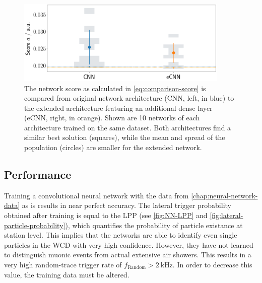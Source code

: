 \begin{figure}
	\centering
	\includegraphics[width=0.9\textwidth]{./plots/CNN_vs_eCNN.png}
	\caption{The network score as calculated in \autoref{eq:comparison-score} is compared from original network architecture (CNN, left, in blue) to the extended
	architecture featuring an additional dense layer (eCNN, right, in orange). Shown are 10 networks of each architecture trained on the same dataset. Both
	architectures find a similar best solution (squares), while the mean and spread of the population (circles) are smaller for the extended network.}
	\label{fig:cnn-vs-ecnn}
\end{figure}

\subsection{Performance}

Training a convolutional neural network with the data from \autoref{chap:neural-network-data} as is results in near perfect accuracy. The lateral trigger 
probability obtained after training is equal to the LPP (see \autoref{fig:NN-LPP} and \autoref{fig:lateral-particle-probability}), which quantifies the probability
of particle existance at station level. This implies that the networks are able to identify even single particles in the WCD with very high confidence. However, 
they have not learned to distinguish muonic events from actual extensive air showers. This results in a very high random-trace trigger rate of 
$f_\text{Random} > \SI{2}{\kilo\hertz}$. In order to decrease this value, the training data must be altered.

